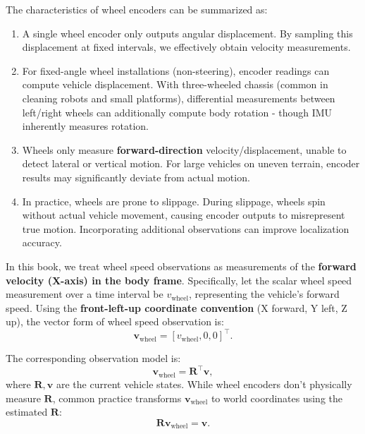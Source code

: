 The characteristics of wheel encoders can be summarized as:
\begin{enumerate}
\item A single wheel encoder only outputs angular displacement. By sampling this displacement at fixed intervals, we effectively obtain velocity measurements.

\item For fixed-angle wheel installations (non-steering), encoder readings can compute vehicle displacement. With three-wheeled chassis (common in cleaning robots and small platforms), differential measurements between left/right wheels can additionally compute body rotation - though IMU inherently measures rotation.

\item Wheels only measure \textbf{forward-direction} velocity/displacement, unable to detect lateral or vertical motion. For large vehicles on uneven terrain, encoder results may significantly deviate from actual motion.

\item In practice, wheels are prone to slippage. During slippage, wheels spin without actual vehicle movement, causing encoder outputs to misrepresent true motion. Incorporating additional observations can improve localization accuracy.
\end{enumerate}
In this book, we treat wheel speed observations as measurements of the \textbf{forward velocity (X-axis) in the body frame}. Specifically, let the scalar wheel speed measurement over a time interval be $v_{\mathrm{wheel}}$, representing the vehicle's forward speed. Using the \textbf{front-left-up coordinate convention} (X forward, Y left, Z up), the vector form of wheel speed observation is:
\begin{equation}\label{eq:wheel-speed-vec}
\bm{v}_{\mathrm{wheel}} = [v_{\mathrm{wheel}}, 0, 0]^\top.
\end{equation}

The corresponding observation model is:
\begin{equation}\label{eq:wheel-obs-model}
\bm{v}_{\mathrm{wheel}} = \bm{R}^\top \bm{v},
\end{equation}
where $\bm{R}, \bm{v}$ are the current vehicle states. While wheel encoders don't physically measure $\bm{R}$, common practice transforms $\bm{v}_{\mathrm{wheel}}$ to world coordinates using the estimated $\bm{R}$:
\begin{equation}\label{eq:world-vel-obs}
\bm{R} \bm{v}_{\mathrm{wheel}} = \bm{v}.
\end{equation}


